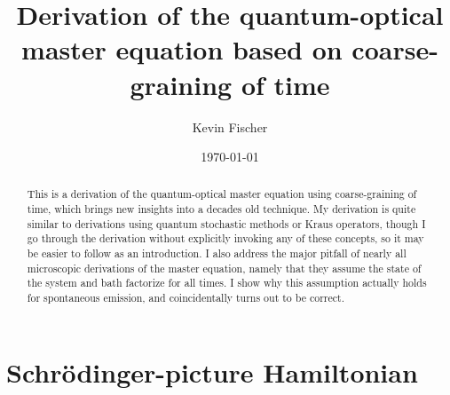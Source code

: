 \documentclass[%
 onecolumn,
 notitlepage,
 longbibliography,
 amsmath,amssymb,
 aps,
 pra,
 10pt,
]{revtex4-1}
\begin{document}
\title{Derivation of the quantum-optical master equation based on coarse-graining of time}%

\author{Kevin Fischer}

\date{\today}%

\begin{abstract}
This is a derivation of the quantum-optical master equation using coarse-graining of time, which brings new insights into a decades old technique. My derivation is quite similar to derivations using quantum stochastic methods or Kraus operators, though I go through the derivation without explicitly invoking any of these concepts, so it may be easier to follow as an introduction. I also address the major pitfall of nearly all microscopic derivations of the master equation, namely that they assume the state of the system and bath factorize for all times. I show why this assumption actually holds for spontaneous emission, and coincidentally turns out to be correct.
\end{abstract}

\maketitle

\section{Schr\"{o}dinger-picture Hamiltonian}
\end{document}
